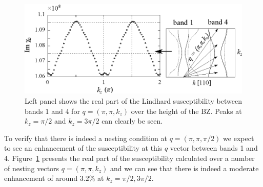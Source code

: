 \begin{figure}[htbp]
    \begin{center}
        \includegraphics[scale=0.9]{Chapter-dHvABaFe2P2/Figures/Susceptibility/NestingVector/NestingVector}
        \caption{Left panel shows the real part of the Lindhard susceptibility between bands $1$ and $4$ for $q=(\pi, \pi, k_z)$ over the height of the \ac{BZ}. Peaks at $k_z=\pi/2$ and $k_z=3\pi/2$ can clearly be seen.}
        \label{Fig:ResD:NestingVector}
    \end{center}
\end{figure}
To verify that there is indeed a nesting condition at $q=(\pi, \pi, \pi/2)$ we expect to see an enhancement of the susceptibility at this $q$ vector between bands 1 and 4. Figure~\ref{Fig:ResD:NestingVector} presents the real part of the susceptibility calculated over a number of nesting vectors $q=(\pi, \pi, k_z)$ and we can see that there is indeed a moderate enhancement of around $3.2\%$ at $k_z=\pi/2, 3\pi/2$.
